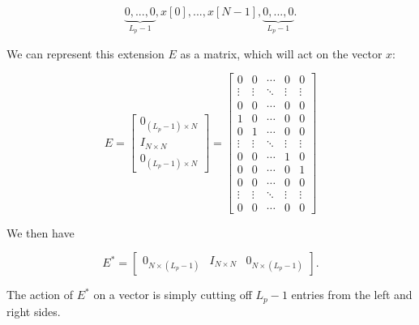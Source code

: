 \documentclass{article}
\theoremstyle{mystuff}
\theoremstyle{myexample}
\theoremstyle{named}
\begin{document}
\[ \underbrace{0, ..., 0}_{L_p-1}, x[0], ..., x[N-1], \underbrace{0, ..., 0}_{L_p-1}. \]

\noindent We can represent this extension $E$ as a matrix, which will act on the vector $x$:

\[ E = \begin{bmatrix} 0_{(L_p-1)\times N}\\ I_{N\times N}\\ 0_{(L_p-1)\times N}\end{bmatrix} = \begin{bmatrix} 0 & 0 & \cdots & 0 & 0\\ \vdots & \vdots &\ddots & \vdots & \vdots\\ 0 & 0 & \cdots & 0 & 0\\[0.5em] 1 & 0 & \cdots & 0 & 0\\ 0 & 1 & \cdots & 0 & 0\\ \vdots & \vdots & \ddots & \vdots & \vdots\\ 0 & 0 & \cdots & 1 & 0\\ 0 & 0 & \cdots & 0 & 1\\[0.5em] 0 & 0 & \cdots & 0 & 0\\ \vdots & \vdots & \ddots & \vdots & \vdots\\ 0 & 0 & \cdots & 0 & 0\end{bmatrix} \] 

\noindent We then have

\[ E^\ast = \begin{bmatrix} 0_{N\times (L_p-1)} & I_{N\times N} & 0_{N\times (L_p-1)} \end{bmatrix}. \] 

\noindent The action of $E^\ast$ on a vector is simply cutting off $L_p-1$ entries from the left and right sides.






\cite{mallat_2009}
\cite{strang_1996}
\cite{beck_2009}
\cite{hansen_2006}



\end{document}

